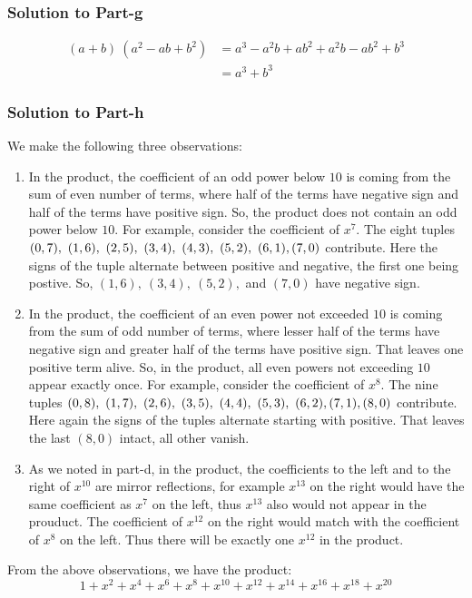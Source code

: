 \documentclass[12pt]{article}
\begin{document}
\subsubsection*{Solution to Part-g}
\begin{displaymath}
	\begin{split}
		(a+b)\ \left( a^2 - ab + b^2 \right) &= a^3 -a^2b+ab^2+a^2b-ab^2+b^3\\
											 &= a^3+b^3
	\end{split}
\end{displaymath}

\subsubsection*{Solution to Part-h}
We make the following three observations:
\begin{enumerate}
\item In the product, the coefficient of an odd power below $10$ is coming from the sum of even number of terms, where half of the terms have negative sign and half of the terms have positive sign. So, the product does not contain an odd power below $10$. For example, consider the coefficient of $x^7$. The eight tuples $(0, 7),\ (1,6),\ (2,5),\ (3,4),\ (4,3),\ (5,2),\ (6,1),\ \\ (7,0)$ contribute. Here the signs of the tuple alternate between positive and negative, the first one being postive. So, $(1,6),\ (3,4),\ (5,2),$ and $(7,0)$ have negative sign.
\item In the product, the coefficient of an even power not exceeded $10$ is coming from the sum of odd number of terms, where lesser half of the terms have negative sign and greater half of the terms have positive sign. That leaves one positive term alive. So, in the product, all even powers not exceeding $10$ appear exactly once. For example, consider the coefficient of $x^8$. The nine tuples $(0,8),\ (1,7),\ (2,6),\ (3,5),\ (4,4),\ (5,3),\ (6,2),\\(7,1),(8,0)$ contribute. Here again the signs of the tuples alternate starting with positive. That leaves the last $(8,0)$ intact, all other vanish.
\item As we noted in part-d, in the product, the coefficients to the left and to the right of $x^{10}$ are mirror reflections, for example $x^{13}$ on the right would have the same coefficient as $x^7$ on the left, thus $x^{13}$ also would not appear in the prouduct. The coefficient of $x^{12}$ on the right would match with the coefficient of $x^{8}$ on the left. Thus there will be exactly one $x^{12}$ in the product. 
\end{enumerate}
From the above observations, we have the product:
\[
1 + x^2 + x^4 + x^6 + x^8 + x^{10} + x^{12} + x^{14} + x^{16} + x^{18} + x^{20}
\]
\end{document}
